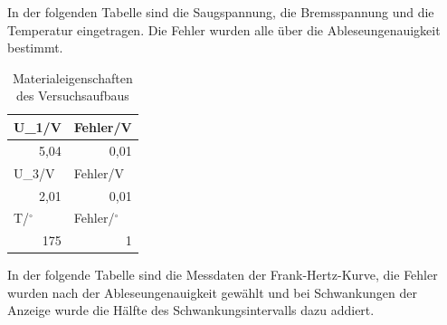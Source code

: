 \documentclass[12pt,a4paper]{article}
\begin{document}
In der folgenden Tabelle sind die Saugspannung, die Bremsspannung und die Temperatur eingetragen. Die Fehler wurden alle über die Ableseungenauigkeit bestimmt.

\begin{table}[htbp]
\caption{Materialeigenschaften des Versuchsaufbaus}
\begin{center}
\begin{tabular}{|l|l|}
\hline
U\_1/V & Fehler/V \\ \hline
\multicolumn{1}{|r|}{5,04} & \multicolumn{1}{r|}{0,01} \\ \hline
U\_3/V & Fehler/V \\ \hline
\multicolumn{1}{|r|}{2,01} & \multicolumn{1}{r|}{0,01} \\ \hline
T/$^\circ$ & Fehler/$^\circ$ \\ \hline
\multicolumn{1}{|r|}{175} & \multicolumn{1}{r|}{1} \\ \hline
\end{tabular}
\end{center}
\label{tab:eingenschaften}
\end{table}

In der folgende Tabelle sind die Messdaten der Frank-Hertz-Kurve, die Fehler wurden nach der Ableseungenauigkeit gewählt und bei Schwankungen der Anzeige wurde die Hälfte des Schwankungsintervalls dazu addiert.
\end{document}
